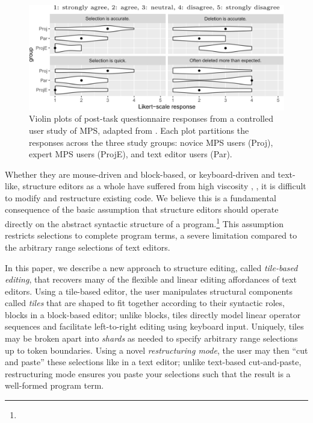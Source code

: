 \begin{figure}[b]
  \centering
  \includegraphics[width=\columnwidth]{img/mps-violin-plots.png}
  \caption{Violin plots of post-task questionnaire responses
  from a controlled user study of MPS, adapted from \cite{ProjEfficiency}.
  Each plot partitions the responses across the three study groups:
  novice MPS users (Proj), expert MPS users (ProjE),
  and text editor users (Par).
  }
  \label{fig:mps-violin-plots}
\end{figure}

Whether they are mouse-driven and block-based,
or keyboard-driven and text-like,
structure editors as a whole have suffered
from high viscosity \cite{cog-dim},
\ie, it is difficult to modify
and restructure existing code.
We believe this is a fundamental consequence
of the basic assumption that structure editors
should operate directly on the abstract syntactic structure
of a program.\footnote{}
This assumption restricts selections to complete
program terms, a severe limitation compared to
the arbitrary range selections of text editors.

In this paper, we describe a new approach to structure
editing, called \emph{tile-based editing}, that
recovers many of the flexible and linear editing
affordances of text editors.
Using a tile-based editor, the user manipulates
structural components called \emph{tiles} that
are shaped to fit together according to their
syntactic roles, \ala blocks in a block-based editor;
unlike blocks, tiles directly model linear
operator sequences and facilitate left-to-right
editing using keyboard input.
Uniquely, tiles may be broken apart into
\emph{shards} as needed to specify arbitrary range
selections up to token boundaries.
Using a novel \emph{restructuring mode}, the user
may then ``cut and paste'' these selections like
in a text editor;
unlike text-based cut-and-paste, restructuring
mode ensures you paste your selections such that
the result is a well-formed program term.


